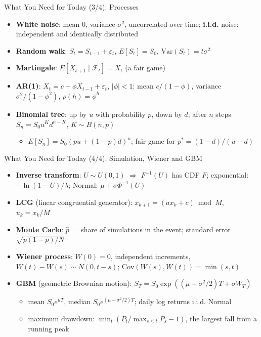 \begin{frame}{What You Need for Today (3/4): Processes}
\itemsize{\footnotesize}
\begin{itemize}
    \item \textbf{White noise}: mean 0, variance $\sigma^2$, uncorrelated over time; \textbf{i.i.d.} noise: independent and identically distributed
    \item \textbf{Random walk}: $S_t = S_{t-1} + \varepsilon_t$, $E[S_t] = S_0$, $\text{Var}(S_t) = t\sigma^2$
    \item \textbf{Martingale}: $E[X_{t+1} \mid \mathcal{F}_t] = X_t$ (a fair game)
    \item \textbf{AR(1)}: $X_t = c + \phi X_{t-1} + \varepsilon_t$, $|\phi| < 1$: mean $c/(1 - \phi)$, variance $\sigma^2/(1 - \phi^2)$, $\rho(h) = \phi^h$
    \item \textbf{Binomial tree}: up by $u$ with probability $p$, down by $d$; after $n$ steps $S_n = S_0u^Kd^{n-K}$, $K \sim B(n, p)$
    \begin{itemize}
        \item $E[S_n] = S_0(pu + (1 - p)d)^n$; fair game for $p^* = (1 - d)/(u - d)$
    \end{itemize}
\end{itemize}
\end{frame}

\begin{frame}{What You Need for Today (4/4): Simulation, Wiener and GBM}
\itemsize{\footnotesize}
\begin{itemize}
    \item \textbf{Inverse transform}: $U \sim U(0, 1)$ $\Rightarrow$ $F^{-1}(U)$ has CDF $F$; exponential: $-\ln(1 - U)/\lambda$; Normal: $\mu + \sigma\Phi^{-1}(U)$
    \item \textbf{LCG} (linear congruential generator): $x_{k+1} = (ax_k + c) \bmod M$, $u_k = x_k/M$
    \item \textbf{Monte Carlo}: $\hat p = $ share of simulations in the event; standard error $\sqrt{p(1 - p)/N}$
    \item \textbf{Wiener process}: $W(0) = 0$, independent increments, $W(t) - W(s) \sim N(0, t - s)$; $\text{Cov}(W(s), W(t)) = \min(s, t)$
    \item \textbf{GBM} (geometric Brownian motion): $S_T = S_0\exp((\mu - \sigma^2/2)T + \sigma W_T)$
    \begin{itemize}
        \item mean $S_0e^{\mu T}$, median $S_0e^{(\mu - \sigma^2/2)T}$; daily log returns i.i.d. Normal
        \item maximum drawdown: $\min_t(P_t/\max_{s \le t}P_s - 1)$, the largest fall from a running peak
    \end{itemize}
\end{itemize}
\end{frame}



